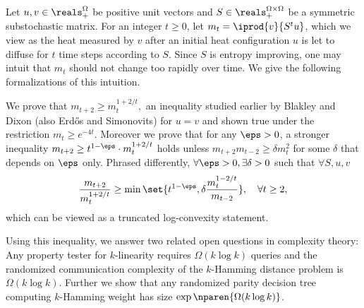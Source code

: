 \renewenvironment{abstract}{\small \list{}{%
    \setlength{\leftmargin}{5mm}%
    \setlength{\rightmargin}{\leftmargin}%
    \listparindent 0em%
  }\item{}}{\endlist}

\begin{abstract}
Let $u,v \in \reals^\Omega_+$ be positive
unit vectors and
$S\in\reals^{\Omega\times\Omega}_+$ be a
symmetric substochastic matrix.
For an integer $t\ge 0$, let 
$m_t = \smash{\iprod{v}{S^tu}}$, which
we view as the
heat measured by $v$ after an initial heat
configuration $u$ is let to diffuse for $t$
time steps according to $S$. 
Since $S$ is entropy improving,
one may intuit that $m_t$ should not change too
rapidly over time. We give the following formalizations
of this intuition.

We prove that
$m_{t+2} \ge m_t^{1+2/t}\!,$ an inequality
studied earlier by Blakley and Dixon 
(also Erdős and Simonovits) for $u=v$
and shown true under the restriction $m_t\ge e^{-4t}$.
Moreover we prove that for any $\eps>0$, 
a stronger inequality 
$m_{t+2} \ge t^{1-\eps}\cdot \smash{m_t^{1+2/t}}$
holds unless
$m_{t+2}m_{t-2}\ge \delta m_t^2$
for some $\delta$ that depends on $\eps$ only.
Phrased differently, $\forall \eps> 0, 
\exists \delta> 0$ such that $\forall S,u,v$
\begin{equation*}
\frac{m_{t+2}}{m_{t}^{1+2/t}}\ge
\min\set{t^{1-\eps}, \delta\frac{m_t^{1-2/t}}{m_{t-2}}},
\quad \forall t \ge 2,
\end{equation*}
which can be viewed as a truncated 
log-convexity statement. 

Using this inequality, we answer two related
open questions in complexity theory: Any
property tester for $k$-linearity requires
$\Omega(k\log k)$ queries and the randomized
communication complexity of the $k$-Hamming
distance problem is $\Omega(k\log k)$.
Further we show that any randomized parity
decision tree computing $k$-Hamming weight has size
$\exp\nparen{\Omega(k\log k)}$.
\end{abstract}
